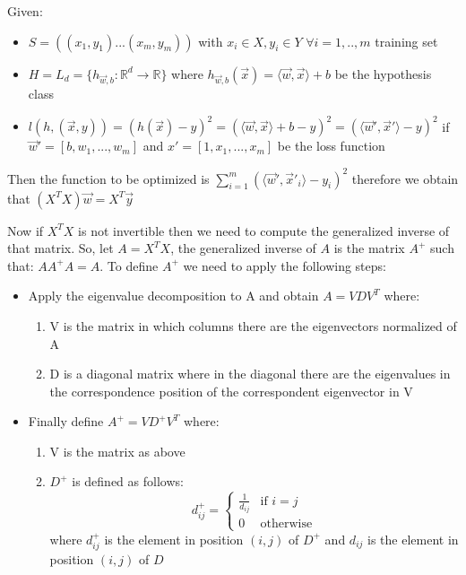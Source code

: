 \documentclass[a4paper,11pt,oneside]{book}
\begin{document}
\begin{enumerate}
\begin{solution}
        Given:
        \begin{itemize}
        \item $S = ((x_1, y_1) ... (x_m, y_m))$ with $x_i \in X, y_i \in Y$ $\forall i = 1,..,m$ training set
        \item $H = L_d = \{h_{\vec{w},b}: \mathbb{R}^d \to \mathbb{R}\}$ where $h_{\vec{w},b}(\vec{x}) = \langle \vec{w},\vec{x} \rangle + b$ be the hypothesis class
        \item $l(h, (\vec{x}, y)) = (h(\vec{x}) - y)^2 = (\langle \vec{w},\vec{x} \rangle + b - y)^2 = (\langle \vec{w}',\vec{x}' \rangle - y)^2$ if $\vec{w}' = [b, w_1, ..., w_m]$ and $x' = [1,x_1, ..., x_m]$ be the loss function
        \end{itemize}
        
        Then the function to be optimized is $\sum_{i=1}^m(\langle \vec{w}',\vec{x}'_i \rangle - y_i)^2$ therefore we obtain that $(X^TX)\vec{w} = X^T\vec{y}$
        
        Now if $X^TX$ is not invertible then we need to compute the generalized inverse of that matrix. So, let $A = X^TX$, the generalized inverse of $A$ is the matrix $A^+$ such that: $AA^+A = A$.
        To define $A^+$ we need to apply the following steps:
        
        \begin{itemize}
        \item Apply the eigenvalue decomposition to A and obtain $A = VDV^T$ where:
        \begin{enumerate}
        \item V is the matrix in which columns there are the eigenvectors normalized of A
        \item D is a diagonal matrix where in the diagonal there are the eigenvalues in the correspondence position of the correspondent eigenvector in V
        \end{enumerate}
        
        \item Finally define $A^+ = VD^+V^T$ where:
        \begin{enumerate}
        \item V is the matrix as above
        \item $D^+$ is defined as follows:
            $$d_{ij}^+ = \begin{cases}
            \frac{1}{d_{ij}} & \text{if } i = j \\
            0 & \text{otherwise}
            \end{cases}$$
            where $d_{ij}^+$ is the element in position $(i,j)$ of $D^+$ and $d_{ij}$ is the element in position $(i,j)$ of $D$
        \end{enumerate}
        \end{itemize}
    \end{solution}
\end{enumerate}
\end{document}
